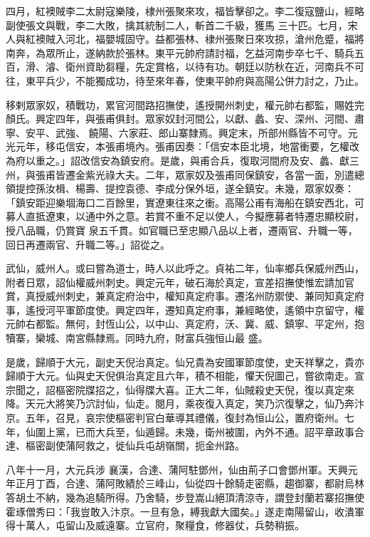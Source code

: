 \begin{pinyinscope}
 四月，紅襖賊李二太尉寇樂陵，棣州張聚來攻，福皆擊卻之。李二復寇鹽山，經略副使張文與戰，李二大敗，擒其統制二人，斬首二千級，獲馬
 三十匹。七月，宋人與紅襖賊入河北，福嬰城固守。益都張林、棣州張聚日來攻掠，滄州危蹙，福將南奔，為眾所止，遂納款於張林。東平元帥府請討福，乞益河南步卒七千、騎兵五百，滑、濬、衛州資助芻糧，先定賞格，以待有功。朝廷以防秋在近，河南兵不可往，東平兵少，不能獨成功，待至來年春，使東平帥府與高陽公併力討之，乃止。



 移剌眾家奴，積戰功，累官河間路招撫使，遙授開州刺史，權元帥右都監，賜姓完顏氏。興定四年，與張甫俱封。眾家奴封河間公，以獻、蠡、安、深州、河間、肅寧、安平、武強、
 饒陽、六家莊、郎山寨隸焉。興定末，所部州縣皆不可守。元光元年，移屯信安，本張甫境內。張甫因奏：「信安本臣北境，地當衝要，乞權改為府以重之。」詔改信安為鎮安府。是歲，與甫合兵，復取河間府及安、蠡、獻三州，與張甫皆遷金紫光祿大夫。二年，眾家奴及張甫同保鎮安，各當一面，別遣總領提控孫汝楫、楊壽、提控袁德、李成分保外垣，遂全鎮安。未幾，眾家奴奏：「鎮安距迎樂堌海口二百餘里，實遼東往來之衝。高陽公甫有海船在鎮安西北，可募人直抵遼東，以通中外之意。若賞不重不足以使人，今擬應募者特遷忠顯校尉，授八品職，仍賞寶
 泉五千貫。如官職已至忠顯八品以上者，遷兩官、升職一等，回日再遷兩官、升職二等。」詔從之。



 武仙，威州人。或曰嘗為道士，時人以此呼之。貞祐二年，仙率鄉兵保威州西山，附者日眾，詔仙權威州刺史。興定元年，破石海於真定，宣差招撫使惟宏請加官賞，真授威州刺史，兼真定府治中，權知真定府事。遷洺州防禦使、兼同知真定府事，遙授河平軍節度使。興定四年，遷知真定府事，兼經略使，遙領中京留守，權元帥右都監。無何，封恆山公，以中山、真定府，沃、冀、威、鎮寧、平定州，抱犢寨，欒城、南宮縣隸焉。同時九府，財富兵強恒山最
 盛。



 是歲，歸順于大元，副史天倪治真定。仙兄貴為安國軍節度使，史天祥擊之，貴亦歸順于大元。仙與史天倪俱治真定且六年，積不相能，懼天倪圖己，嘗欲南走。宣宗聞之，詔樞密院牒招之，仙得牒大喜。正大二年，仙賊殺史天倪，復以真定來降。天元大將笑乃泬討仙，仙走。閱月，乘夜復入真定，笑乃泬復擊之，仙乃奔汴京。五年，召見，哀宗使樞密判官白華導其禮儀，復封為恒山公，置府衛州。七年，仙圍上黨，已而大兵至，仙遁歸。未幾，衛州被圍，內外不通。詔平章政事合達、樞密副使蒲阿救之，徙仙兵屯胡嶺關，扼金州路。



 八年十一月，大元兵涉
 襄漢，合達、蒲阿駐鄧州，仙由荊子口會鄧州軍。天興元年正月丁酉，合達、蒲阿敗績於三峰山，仙從四十餘騎走密縣，趨御寨，都尉烏林答胡土不納，幾為追騎所得。乃舍騎，步登嵩山絕頂清涼寺，謂登封蘭若寨招撫使霍琢僧秀曰：「我豈敢入汴京。一旦有急，縛我獻大國矣。」遂走南陽留山，收潰軍得十萬人，屯留山及威遠寨。立官府，聚糧食，修器仗，兵勢稍振。




\end{pinyinscope}
